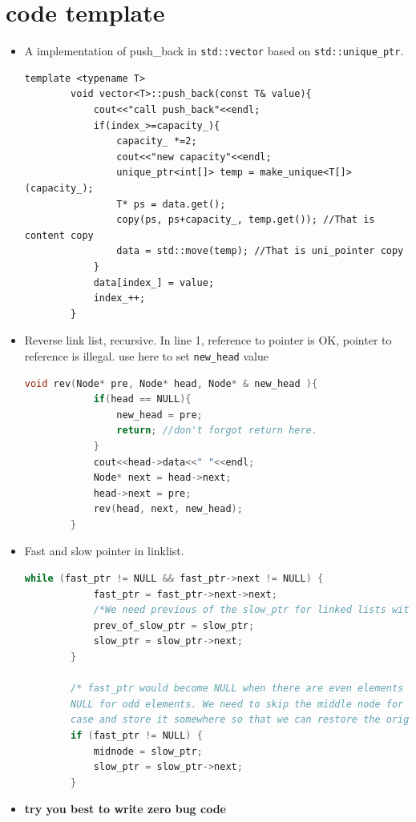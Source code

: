 \documentclass[a4paper,11pt,twoside]{book}
\begin{document}
\section{code template}

\begin{itemize}
	
		\item A implementation of push\_back in \texttt{std::vector} based on \texttt{std::unique\_ptr}. 
	
	\begin{lstlisting}[numbers=none]
		template <typename T>
		void vector<T>::push_back(const T& value){
			cout<<"call push_back"<<endl;
			if(index_>=capacity_){
				capacity_ *=2;
				cout<<"new capacity"<<endl;
				unique_ptr<int[]> temp = make_unique<T[]>(capacity_);
				T* ps = data.get();
				copy(ps, ps+capacity_, temp.get()); //That is content copy
				data = std::move(temp); //That is uni_pointer copy
			}
			data[index_] = value;
			index_++;
		}		
	\end{lstlisting}
	
		\item Reverse link list, recursive. In line 1, reference to pointer is OK, pointer to reference is illegal. use here to set \texttt{new\_head} value
	\begin{lstlisting}[frame=single, language=c++]	
		void rev(Node* pre, Node* head, Node* & new_head ){ 
			if(head == NULL){
				new_head = pre;
				return; //don't forgot return here. 
			}
			cout<<head->data<<" "<<endl;
			Node* next = head->next;
			head->next = pre;
			rev(head, next, new_head);
		}	
	\end{lstlisting}
	
	
		\item Fast and slow pointer in linklist.	
	\begin{lstlisting}[frame=single, language=c++]	
		while (fast_ptr != NULL && fast_ptr->next != NULL) {
			fast_ptr = fast_ptr->next->next;	
			/*We need previous of the slow_ptr for linked lists with odd elements */
			prev_of_slow_ptr = slow_ptr;
			slow_ptr = slow_ptr->next;
		}
		
		/* fast_ptr would become NULL when there are even elements in list.And not 
		NULL for odd elements. We need to skip the middle node for odd 
		case and store it somewhere so that we can restore the original list*/
		if (fast_ptr != NULL) {
			midnode = slow_ptr;
			slow_ptr = slow_ptr->next;
		}		
	\end{lstlisting}
	
	\item \textbf{try you best to write zero bug code}
	

\end{itemize}
\end{document}
